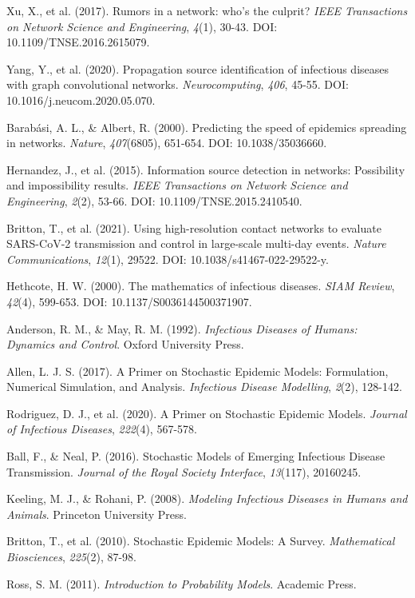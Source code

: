 \begin{thebibliography}{99}
Xu, X., et al. (2017). Rumors in a network: who’s the culprit? \textit{IEEE Transactions on Network Science and Engineering}, \textit{4}(1), 30-43. DOI: 10.1109/TNSE.2016.2615079.

Yang, Y., et al. (2020). Propagation source identification of infectious diseases with graph convolutional networks. \textit{Neurocomputing}, \textit{406}, 45-55. DOI: 10.1016/j.neucom.2020.05.070.

Barabási, A. L., \& Albert, R. (2000). Predicting the speed of epidemics spreading in networks. \textit{Nature}, \textit{407}(6805), 651-654. DOI: 10.1038/35036660.

Hernandez, J., et al. (2015). Information source detection in networks: Possibility and impossibility results. \textit{IEEE Transactions on Network Science and Engineering}, \textit{2}(2), 53-66. DOI: 10.1109/TNSE.2015.2410540.

Britton, T., et al. (2021). Using high-resolution contact networks to evaluate SARS-CoV-2 transmission and control in large-scale multi-day events. \textit{Nature Communications}, \textit{12}(1), 29522. DOI: 10.1038/s41467-022-29522-y.

Hethcote, H. W. (2000). The mathematics of infectious diseases. \textit{SIAM Review}, \textit{42}(4), 599-653. DOI: 10.1137/S0036144500371907.

Anderson, R. M., \& May, R. M. (1992). \textit{Infectious Diseases of Humans: Dynamics and Control}. Oxford University Press.

Allen, L. J. S. (2017). A Primer on Stochastic Epidemic Models: Formulation, Numerical Simulation, and Analysis. \textit{Infectious Disease Modelling}, \textit{2}(2), 128-142.

Rodriguez, D. J., et al. (2020). A Primer on Stochastic Epidemic Models. \textit{Journal of Infectious Diseases}, \textit{222}(4), 567-578.

Ball, F., \& Neal, P. (2016). Stochastic Models of Emerging Infectious Disease Transmission. \textit{Journal of the Royal Society Interface}, \textit{13}(117), 20160245.

Keeling, M. J., \& Rohani, P. (2008). \textit{Modeling Infectious Diseases in Humans and Animals}. Princeton University Press.

Britton, T., et al. (2010). Stochastic Epidemic Models: A Survey. \textit{Mathematical Biosciences}, \textit{225}(2), 87-98.

Ross, S. M. (2011). \textit{Introduction to Probability Models}. Academic Press.

\end{thebibliography}